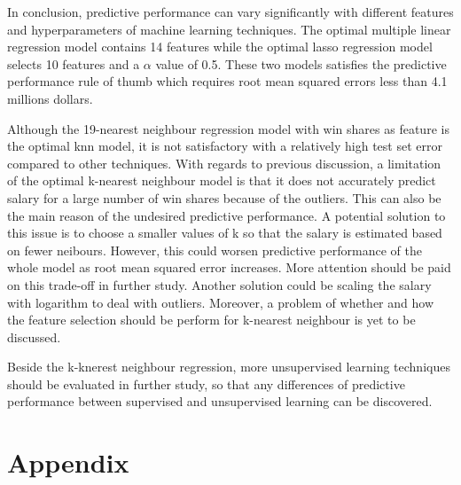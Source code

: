 \documentclass[letterpaper,12pt,twoside,]{pinp}
\begin{document}
In conclusion, predictive performance can vary significantly with
different features and hyperparameters of machine learning techniques.
The optimal multiple linear regression model contains 14 features while
the optimal lasso regression model selects 10 features and a \(\alpha\)
value of 0.5. These two models satisfies the predictive performance rule
of thumb which requires root mean squared errors less than 4.1 millions
dollars.

Although the 19-nearest neighbour regression model with win shares as
feature is the optimal knn model, it is not satisfactory with a
relatively high test set error compared to other techniques. With
regards to previous discussion, a limitation of the optimal k-nearest
neighbour model is that it does not accurately predict salary for a
large number of win shares because of the outliers. This can also be the
main reason of the undesired predictive performance. A potential
solution to this issue is to choose a smaller values of k so that the
salary is estimated based on fewer neibours. However, this could worsen
predictive performance of the whole model as root mean squared error
increases. More attention should be paid on this trade-off in further
study. Another solution could be scaling the salary with logarithm to
deal with outliers. Moreover, a problem of whether and how the feature
selection should be perform for k-nearest neighbour is yet to be
discussed.

Beside the k-knerest neighbour regression, more unsupervised learning
techniques should be evaluated in further study, so that any differences
of predictive performance between supervised and unsupervised learning
can be discovered.

\vfill

\hypertarget{appendix}{%
\section{Appendix}\label{appendix}}
\end{document}
